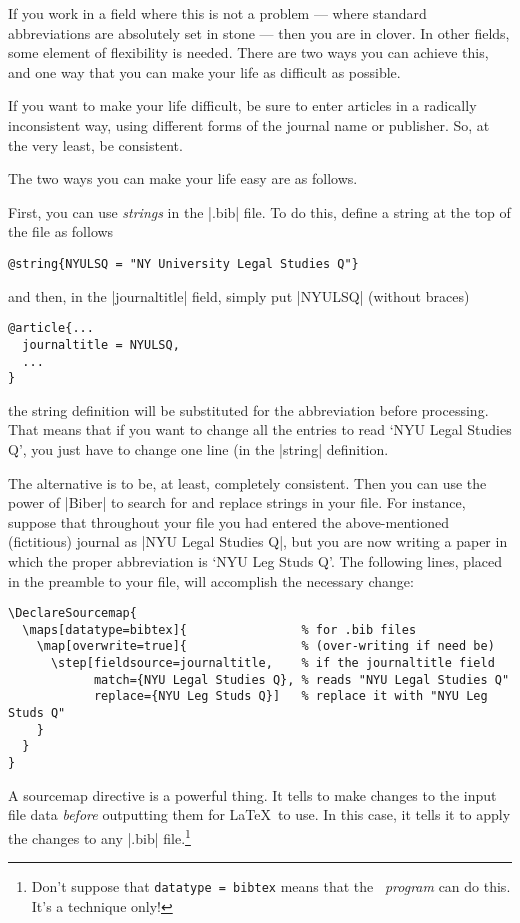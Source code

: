 {If you work in a field where this is not a problem --- where standard
abbreviations are absolutely set in stone --- then you are in
clover. In other fields, some element of flexibility is needed. There
are two ways you can achieve this, and one way that you can make your
life as difficult as possible.

If you want to make your life difficult, be sure to enter articles in
a radically inconsistent way, using different forms of the journal
name or publisher. So, at the very least, be consistent.

The two ways you can make your life easy are as follows.

First, you can use \emph{strings} in the |.bib| file. To do this,
define a string at the top of the file as follows
\begin{Verbatim}
@string{NYULSQ = "NY University Legal Studies Q"}
\end{Verbatim}
and then, in the |journaltitle| field, simply put |NYULSQ| (without braces)
\begin{Verbatim}
@article{...
  journaltitle = NYULSQ,
  ...
}
\end{Verbatim}
the string definition will be substituted for the abbreviation before
processing. That means that if you want to change all the entries to
read `NYU Legal Studies Q', you just have to change one line (in the
|string| definition.

The alternative is to be, at least, completely consistent. Then you
can use the power of |Biber| to search for and replace strings in your
file. For instance, suppose that throughout your file you had entered
the above-mentioned (fictitious) journal as |NYU Legal Studies Q|, but
you are now writing a paper in which the proper abbreviation is `NYU
Leg Studs Q'. The following lines, placed in the preamble to your
file, will accomplish the necessary change:\label{datamap}

\begin{Verbatim}
\DeclareSourcemap{
  \maps[datatype=bibtex]{                % for .bib files
    \map[overwrite=true]{                % (over-writing if need be)
      \step[fieldsource=journaltitle,    % if the journaltitle field
            match={NYU Legal Studies Q}, % reads "NYU Legal Studies Q"
            replace={NYU Leg Studs Q}]   % replace it with "NYU Leg Studs Q"
    }
  }
}
\end{Verbatim}

A sourcemap directive is a powerful thing. It tells  to make changes to the input
file data \emph{before} outputting them for \LaTeX\ to use. In this
case, it tells it to apply the changes to any |.bib|
file.\footnote{Don't suppose that \texttt{datatype = bibtex} means that
  the \bibtex\ \emph{program} can do this. It's a 
  technique only!}

}
